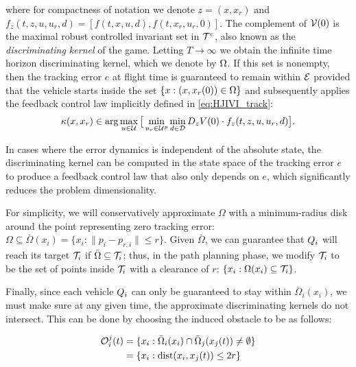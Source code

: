 \noindent where for compactness of notation we denote $z=(x,x_r)$ and $f_z(t,z,u,u_r,d) = [f(t,x,u,d),f(t,x_r,u_r,0)]$.
 The complement of $\mathcal{V}(0)$ is the maximal robust controlled invariant set in $\mathcal{T}^\text{c}$, also known as the \emph{discriminating kernel} of the game. Letting $T\to\infty$ we obtain the infinite time horizon discriminating kernel, which we denote by $\Omega$. If this set is nonempty, then the tracking error $e$ at flight time is guaranteed to remain within $\mathcal{E}$ provided that the vehicle starts inside the set $\{x: (x,x_r(0))\in\Omega\}$ and subsequently applies the feedback control law implicitly defined in \eqref{eq:HJIVI_track}:
\begin{equation}\label{eq:robust_tracking_law}
\kappa(x,x_r) \in \arg\max_{u \in \mathcal{U}} \big[\min_{u_r \in\mathcal{U}^p} \min_{d \in \mathcal{D}} D_z V(0) \cdot f_z(t,z,u,u_r,d)\big].
\end{equation}

In cases where the error dynamics is independent of the absolute state, the discriminating kernel can be computed in the state space of the tracking error $e$ to produce a feedback control law that also only depends on $e$, which significantly reduces the problem dimensionality.

For simplicity, we will conservatively approximate $\Omega$ with a minimum-radius disk around the point representing zero tracking error: $\Omega \subseteq \bar\Omega(x_i) = \{x_i: \|p_i - p_{r, i}\| \le r\}$. Given $\bar\Omega$, we can guarantee that $Q_i$ will reach its target $\mathcal{T}_i$ if $\bar\Omega \subseteq \mathcal{T}_i$; thus, in the path planning phase, we modify $\mathcal{T}_i$ to be the set of points inside $\mathcal{T}_i$ with a clearance of $r$: $\{x_i: \Omega(x_i) \subseteq \mathcal{T}_i\}$.

Finally, since each vehicle $Q_i$ can only be guaranteed to stay within $\bar\Omega_i(x_i)$, we must make sure at any given time, the approximate discriminating kernels do not intersect. This can be done by choosing the induced obstacle to be as follows:

\begin{equation}
\begin{aligned}
\mathcal{O}_i^j(t) &= \{x_i: \bar\Omega_i(x_i) \cap \bar\Omega_j(x_j(t)) \neq \emptyset\} \\
& = \{x_i: \text{dist}(x_i, x_j(t)) \le 2r \}
\end{aligned}
\end{equation}


